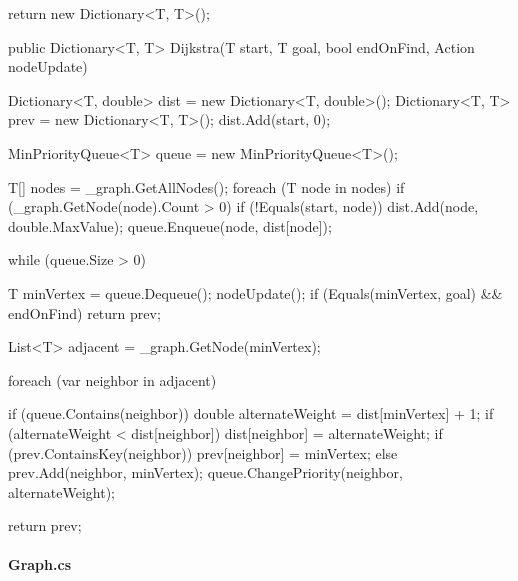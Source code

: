 \begin{flushleft}
\begin{cscode}
{{        return new Dictionary<T, T>();
    }

    public Dictionary<T, T> Dijkstra(T start, T goal, bool endOnFind, Action nodeUpdate)
    {
        Dictionary<T, double> dist = new Dictionary<T, double>();
        Dictionary<T, T> prev = new Dictionary<T, T>();
        dist.Add(start, 0);

        MinPriorityQueue<T> queue = new MinPriorityQueue<T>();

        T[] nodes = _graph.GetAllNodes();
        foreach (T node in nodes)
        {
            if (_graph.GetNode(node).Count > 0)
            {
                if (!Equals(start, node)) dist.Add(node, double.MaxValue);
                queue.Enqueue(node, dist[node]);
            }
        }

        while (queue.Size > 0)
        {
            T minVertex = queue.Dequeue();
            nodeUpdate();
            if (Equals(minVertex, goal) && endOnFind) return prev;

            List<T> adjacent = _graph.GetNode(minVertex);

            foreach (var neighbor in adjacent)
            {

                if (queue.Contains(neighbor))
                {
                    double alternateWeight = dist[minVertex] + 1;
                    if (alternateWeight < dist[neighbor])
                    {
                        dist[neighbor] = alternateWeight;
                        if (prev.ContainsKey(neighbor)) prev[neighbor] = minVertex;
                        else prev.Add(neighbor, minVertex);
                        queue.ChangePriority(neighbor, alternateWeight);
                    }
                }
            }
        }

        return prev;
    }
}
    \end{cscode}
\pagebreak

    \paragraph{Graph.cs}
\end{flushleft}
